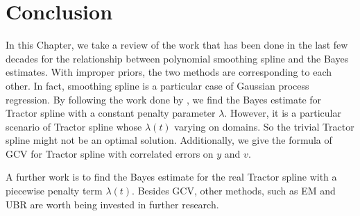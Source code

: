 \section{Conclusion}

In this Chapter, we take a review of the work that has been done in the last few decades for the relationship between polynomial smoothing spline and the Bayes estimates. With improper priors, the two methods are corresponding to each other. In fact, smoothing spline is a particular case of Gaussian process regression. By following the work done by \cite{gu2013smoothing}, we find the Bayes estimate for Tractor spline with a constant penalty parameter $\lambda$.  However, it is a particular scenario of Tractor spline whose $\lambda(t)$ varying on domains. So the trivial Tractor spline might not be an optimal solution. Additionally, we give the formula of GCV for Tractor spline with correlated errors on $y$ and $v$. 


A further work is to find the Bayes estimate for the real Tractor spline with a piecewise penalty term $\lambda(t)$. Besides GCV, other methods, such as EM and UBR are worth being invested in further research. 








